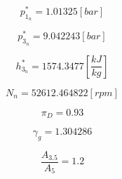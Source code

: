 \documentclass[titlepage]{article}
\begin{document}
\begin{equation}
  p_{1_{n}}^{*} =  1.01325 [bar]
\end{equation}

\begin{equation}
  p_{3_{n}}^{*} =  9.042243 [bar]
\end{equation}

\begin{equation}
  h_{3_{n}}^{*} =  1574.3477 \left[\frac{kJ}{kg}\right]
\end{equation}

\begin{equation}
  N_{n} = 52612.464822 [rpm]
\end{equation}

\begin{equation}
  \pi_{D} = 0.93
\end{equation}

\begin{equation}
  \gamma_{g} = 1.304286
\end{equation}

\begin{equation}
  \frac{A_{3.5}}{A_{5}} = 1.2
\end{equation}
\end{document}
